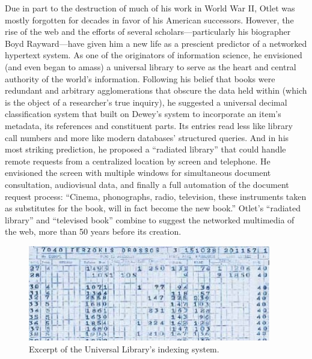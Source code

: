 Due in part to the destruction of much of his work in World War II, Otlet was mostly forgotten for decades in favor of his American successors. However, the rise of the web and the efforts of several scholars---particularly his biographer Boyd Rayward---have given him a new life as a prescient predictor of a networked hypertext system. As one of the originators of information science, he envisioned (and even began to amass) a universal library to serve as the heart and central authority of the world's information. Following his belief that books were redundant and arbitrary agglomerations that obscure the data held within (which is the object of a researcher's true inquiry), he suggested a universal decimal classification system that built on Dewey's system to incorporate an item's metadata, its references and constituent parts. Its entries read less like library call numbers and more like modern databases' structured queries. And in his most striking prediction, he proposed a ``radiated library'' that could handle remote requests from a centralized location by screen and telephone. He envisioned the screen with multiple windows for simultaneous document consultation, audiovisual data, and finally a full automation of the document request process: ``Cinema, phonographs, radio, television, these instruments taken as substitutes for the book, will in fact become the new book.''\autocite{van_veelen_alle_1998} Otlet's ``radiated library'' and ``televised book'' combine to suggest the networked multimedia of the web, more than 50 years before its creation.

\begin{figure}[ht]
\centering
\includegraphics[width=300pt]{figures/otlet}
\caption{Excerpt of the Universal Library's indexing system.}
\label{fig:otlet}
\end{figure}

